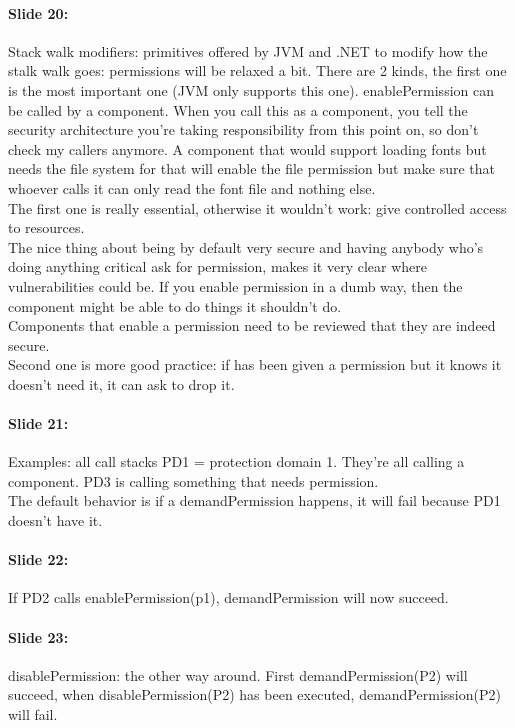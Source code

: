 \documentclass[10pt,a4paper]{report}
\begin{document}
\paragraph{Slide 20:} Stack walk modifiers: primitives offered by JVM and .NET to modify how the stalk walk goes: permissions will be relaxed a bit. There are 2 kinds, the first one is the most important one (JVM only supports this one). enablePermission can be called by a component. When you call this as a component, you tell the security architecture you're taking responsibility from this point on, so don't check my callers anymore. A component that would support loading fonts but needs the file system for that will enable the file permission but make sure that whoever calls it can only read the font file and nothing else.\\ 
The first one is really essential, otherwise it wouldn't work: give controlled access to resources. \\
The nice thing about being by default very secure and having anybody who's doing anything critical ask for permission, makes it very clear where vulnerabilities could be. If you enable permission in a dumb way, then the component might be able to do things it shouldn't do. \\
Components that enable a permission need to be reviewed that they are indeed secure.\\
Second one is more good practice: if has been given a permission but it knows it doesn't need it, it can ask to drop it. 

\paragraph{Slide 21:} Examples: all call stacks PD1 = protection domain 1. They're all calling a component. PD3 is calling something that needs permission.\\
The default behavior is if a demandPermission happens, it will fail because PD1 doesn't have it.

\paragraph{Slide 22:} If PD2 calls enablePermission(p1), demandPermission will now succeed.

\paragraph{Slide 23:} disablePermission: the other way around. First demandPermission(P2) will succeed, when disablePermission(P2) has been executed, demandPermission(P2) will fail.
\end{document}
